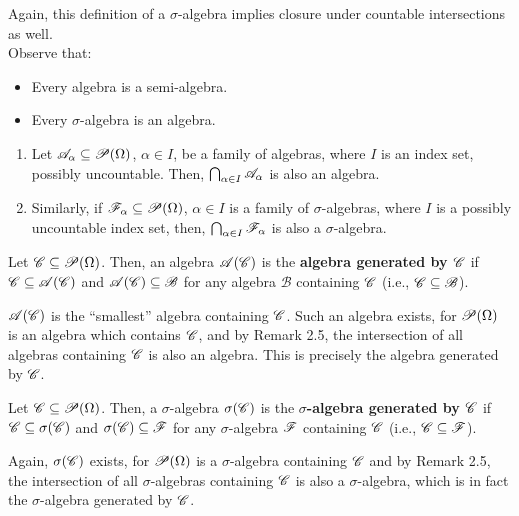 Again, this definition of a $\sigma$-algebra implies closure under countable intersections as well.\\

\noindent Observe that:
\begin{itemize}
  \item Every algebra is a semi-algebra.
  \item Every $\sigma$-algebra is an algebra.
\end{itemize}

\begin{remark}
  \begin{enumerate}
    \item Let $\mathscr{A}_{\alpha} \subseteq \mathscr{P}(\Omega)$, $\alpha \in I$, be a family of algebras, where $I$ is an index set, possibly uncountable. Then, $\bigcap_{\alpha \in I} \mathscr{A}_{\alpha}$ is also an algebra.

    \item Similarly, if $\mathscr{F}_{\alpha} \subseteq \mathscr{P}(\Omega)$, $\alpha \in I$ is a family of $\sigma$-algebras, where $I$ is a possibly uncountable index set, then, $\bigcap_{\alpha \in I} \mathscr{F}_{\alpha}$ is also a $\sigma$-algebra.
  \end{enumerate}
\end{remark}

\begin{definition}
  Let $\mathscr{C} \subseteq \mathscr{P}(\Omega)$. Then, an algebra $\mathscr{A}(\mathscr{C})$ is the \textbf{algebra generated by $\mathscr{C}$} if $\mathscr{C} \subseteq \mathscr{A}(\mathscr{C})$ and $\mathscr{A}(\mathscr{C}) \subseteq \mathscr{B}$ for any algebra $\mathscr{B}$ containing $\mathscr{C}$ (i.e., $\mathscr{C} \subseteq \mathscr{B}$).
\end{definition}

$\mathscr{A}(\mathscr{C})$ is the ``smallest'' algebra containing $\mathscr{C}$. Such an algebra exists, for $\mathscr{P}(\Omega)$ is an algebra which contains $\mathscr{C}$, and by Remark 2.5, the intersection of all algebras containing $\mathscr{C}$ is also an algebra. This is precisely the algebra generated by $\mathscr{C}$. 

\begin{definition}
  Let $\mathscr{C} \subseteq \mathscr{P}(\Omega)$. Then, a $\sigma$-algebra $\sigma(\mathscr{C})$ is the \textbf{$\sigma$-algebra generated by $\mathscr{C}$} if $\mathscr{C} \subseteq \sigma(\mathscr{C})$ and $\sigma(\mathscr{C}) \subseteq \mathscr{F}$ for any $\sigma$-algebra $\mathscr{F}$ containing $\mathscr{C}$ (i.e., $\mathscr{C} \subseteq \mathscr{F}$).
\end{definition}

Again, $\sigma(\mathscr{C})$ exists, for $\mathscr{P}(\Omega)$ is a $\sigma$-algebra containing $\mathscr{C}$ and by Remark 2.5, the intersection of all $\sigma$-algebras containing $\mathscr{C}$ is also a $\sigma$-algebra, which is in fact the $\sigma$-algebra generated by $\mathscr{C}$. 

